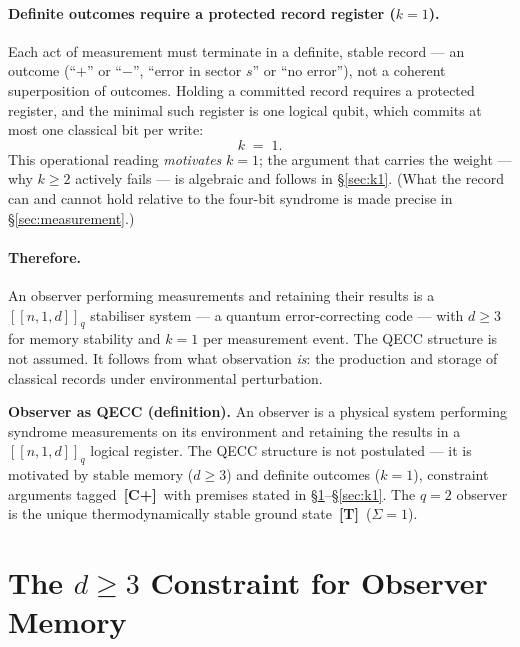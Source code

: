 \documentclass[11pt,a4paper]{article}
\newcommand{\Cpmark}{\textcolor{blue!70!black}{\textbf{[C+]}}}
\newcommand{\Tmark}{\textcolor{orange!70!black}{\textbf{[T]}}}
\begin{document}
\paragraph{Definite outcomes require a protected record register ($k=1$).}
Each act of measurement must terminate in a definite, stable record --- an outcome (``$+$'' or ``$-$'', ``error in sector $s$'' or ``no error''), not a coherent superposition of outcomes. Holding a committed record requires a protected register, and the minimal such register is one logical qubit, which commits at most one classical bit per write:
\begin{equation}
  k \;=\; 1.
  \label{eq:k1_obs}
\end{equation}
This operational reading \emph{motivates} $k=1$; the argument that carries the weight --- why $k\geq2$ actively fails --- is algebraic and follows in \S\ref{sec:k1}. (What the record can and cannot hold relative to the four-bit syndrome is made precise in \S\ref{sec:measurement}.)

\paragraph{Therefore.}
An observer performing measurements and retaining their results is a $[\![n,1,d]\!]_q$ stabiliser system --- a quantum error-correcting code --- with $d\geq3$ for memory stability and $k=1$ per measurement event. The QECC structure is not assumed. It follows from what observation \emph{is}: the production and storage of classical records under environmental perturbation.

\begin{mdframed}[backgroundcolor=defbg,linecolor=defcol,linewidth=1.5pt]
\textbf{Observer as QECC (definition).}\quad
An observer is a physical system performing syndrome measurements on its environment and retaining the results in a $[\![n,1,d]\!]_q$ logical register. The QECC structure is not postulated --- it is motivated by stable memory ($d\geq3$) and definite outcomes ($k=1$), constraint arguments tagged~\Cpmark\ with premises stated in \S\ref{sec:d3}--\S\ref{sec:k1}. The $q=2$ observer is the unique thermodynamically stable ground state~\Tmark\ ($\Sigma=1$).
\end{mdframed}

\section{The $d\geq3$ Constraint for Observer Memory}
\label{sec:d3}
\end{document}
